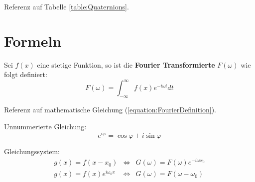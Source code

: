 Referenz auf Tabelle \ref{table:Quaternions}.

\section{Formeln}
\label{section:MathematicalStuff}

Sei $f(x)$ eine stetige Funktion, so ist die \textbf{Fourier Transformierte}
$F(\omega)$ wie folgt definiert:
\begin{equation}
\label{equation:FourierDefinition}
	F(\omega) = \int_{-\infty}^{\infty} f(x) e^{-i\omega t} dt
\end{equation}

Referenz auf mathematische Gleichung (\ref{equation:FourierDefinition}).

Unnummerierte Gleichung:
\begin{equation*}
	e^{i\varphi} = \cos\varphi + i \sin\varphi
\end{equation*}

Gleichungssystem:
\begin{eqnarray}
	g(x) = f(x - x_0) & \Leftrightarrow &
		G(\omega) = F(\omega) e^{-i\omega x_0} \\
	g(x) = f(x) e^{i\omega_0 x} & \Leftrightarrow &
		G(\omega) = F(\omega - \omega_0)
\end{eqnarray}
